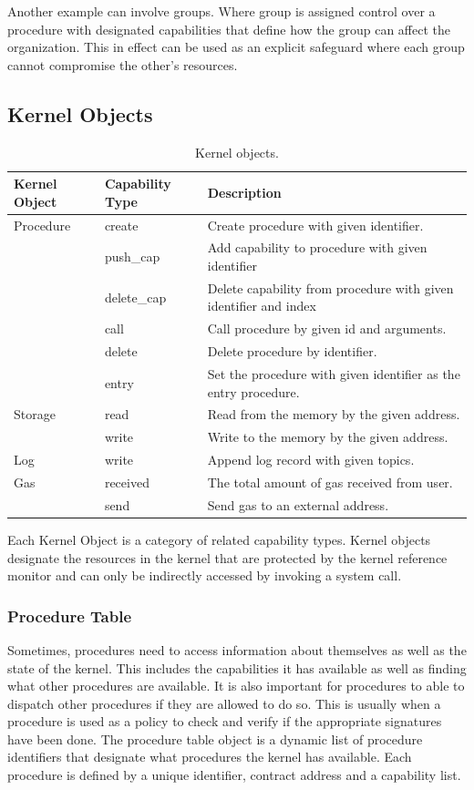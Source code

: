 \documentclass[english,a4paper]{article}
\let\oldparagraph\subsubsection
\renewcommand{\subsubsection}[1]{\oldparagraph{#1}\mbox{}}
\begin{document}
Another example can involve groups. Where group is assigned control over
a procedure with designated capabilities that define how the group can
affect the organization. This in effect can be used as an explicit
safeguard where each group cannot compromise the other's resources.

\subsection{Kernel Objects}\label{kernel-objects}
\begin{table}[H]
    \caption{Kernel objects.}
    \centering{}%
    \begin{tabular}{l|l|p{}}


        \hline
        Kernel Object & Capability Type & Description\tabularnewline
        \hline
        \hline
        Procedure & create & Create procedure with given
        identifier.\tabularnewline
        & push\_cap & Add capability to procedure with given
        identifier\tabularnewline
        & delete\_cap & Delete capability from procedure with given identifier
        and index\tabularnewline
        & call & Call procedure by given id and arguments.\tabularnewline
        & delete & Delete procedure by identifier.\tabularnewline
        & entry & Set the procedure with given identifier as the entry
        procedure.\tabularnewline
        \hline
        Storage & read & Read from the memory by the given
        address.\tabularnewline
        & write & Write to the memory by the given address.\tabularnewline
        \hline
        Log & write & Append log record with given topics.\tabularnewline
        \hline
        Gas & received & The total amount of gas received from
        user.\tabularnewline
        & send & Send gas to an external address.\tabularnewline
        \hline
    \end{tabular}
\end{table}

Each Kernel Object is a category of related capability types. Kernel
objects designate the resources in the kernel that are protected by the
kernel reference monitor and can only be indirectly accessed by invoking
a system call.

\subsubsection{Procedure Table}\label{procedure-table}
Sometimes, procedures need to access information about themselves as
well as the state of the kernel. This includes the capabilities it has
available as well as finding what other procedures are available. It is
also important for procedures to able to dispatch other procedures if
they are allowed to do so. This is usually when a procedure is used as a
policy to check and verify if the appropriate signatures have been done.
The procedure table object is a dynamic list of procedure identifiers
that designate what procedures the kernel has available. Each procedure
is defined by a unique identifier, contract address and a capability
list.
\end{document}
